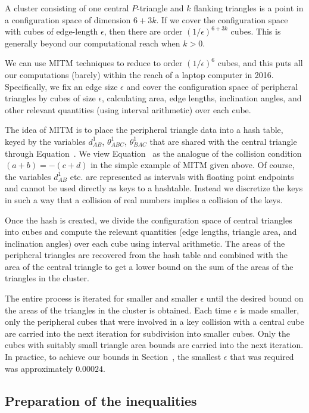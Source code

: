 A cluster consisting of one central $P$-triangle and $k$ flanking
triangles is a point in a configuration space of dimension $6 + 3k$.
If we cover the configuration space with cubes of edge-length
$\epsilon$, then there are order $(1/\epsilon)^{6+3k}$ cubes.  This is
generally beyond our computational reach when $k>0$.

We can use MITM techniques to reduce to order $(1/\epsilon)^6$ cubes,
and this puts all our computations (barely) within the reach of a
laptop computer in 2016.  Specifically, we fix an edge size $\epsilon$ and
cover the configuration space of peripheral triangles by cubes of size
$\epsilon$, calculating area, edge lengths, inclination angles, and
other relevant quantities (using interval arithmetic) over each cube.

The idea of MITM is to place the peripheral triangle data into a hash
table, keyed by the variables $d^1_{AB}$, $\theta^1_{ABC}$,
$\theta^1_{BAC}$ that are shared with the central triangle through
Equation~.  We view Equation~ as
the analogue of the collision condition $(a+b) = -(c+d)$ in the simple
example of MITM given above.  Of course, the variables $d^1_{AB}$
etc. are represented as intervals with floating point endpoints and
cannot be used directly as keys to a hashtable.  Instead we discretize
the keys in such a way that a collision of real numbers implies a
collision of the keys.

Once the hash is created, we divide the configuration space of central
triangles into cubes and compute the relevant quantities (edge
lengths, triangle area, and inclination angles) over each cube using
interval arithmetic.  The areas of the peripheral triangles are
recovered from the hash table and combined with the area of the
central triangle to get a lower bound on the sum of the areas of the
triangles in the cluster.

The entire process is iterated for smaller and smaller $\epsilon$
until the desired bound on the areas of the triangles in the cluster
is obtained.  Each time $\epsilon$ is made smaller, only the
peripheral cubes that were involved in a key collision with a central
cube are carried into the next iteration for subdivision into smaller
cubes.  Only the cubes with suitably small triangle area bounds are
carried into the next iteration.  In practice, to achieve our bounds
in Section~, the smallest $\epsilon$ that was required
was approximately $0.00024$.

\subsection{Preparation of the inequalities}

